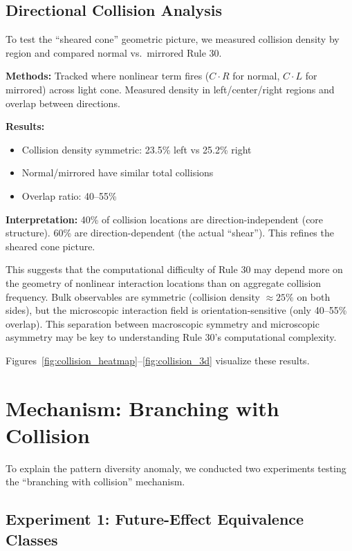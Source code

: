 \documentclass[11pt]{article}
\begin{document}
\subsection{Directional Collision Analysis}

To test the ``sheared cone'' geometric picture, we measured collision density
by region and compared normal vs.\ mirrored Rule 30.

\textbf{Methods:} Tracked where nonlinear term fires ($C \cdot R$ for normal, $C \cdot L$
for mirrored) across light cone. Measured density in left/center/right
regions and overlap between directions.

\textbf{Results:}
\begin{itemize}
    \item Collision density symmetric: 23.5\% left vs 25.2\% right
    \item Normal/mirrored have similar total collisions
    \item Overlap ratio: 40--55\%
\end{itemize}

\textbf{Interpretation:} 40\% of collision locations are direction-independent
(core structure). 60\% are direction-dependent (the actual ``shear''). This
refines the sheared cone picture.

This suggests that the computational difficulty of Rule 30 may depend more on
the geometry of nonlinear interaction locations than on aggregate collision
frequency. Bulk observables are symmetric (collision density $\approx 25\%$ on
both sides), but the microscopic interaction field is orientation-sensitive
(only 40--55\% overlap). This separation between macroscopic symmetry and
microscopic asymmetry may be key to understanding Rule 30's computational
complexity.

Figures~\ref{fig:collision_heatmap}--\ref{fig:collision_3d} visualize these results.

\section{Mechanism: Branching with Collision}
\label{sec:mechanism}

To explain the pattern diversity anomaly, we conducted two experiments testing the ``branching with collision'' mechanism.

\subsection{Experiment 1: Future-Effect Equivalence Classes}
\end{document}

